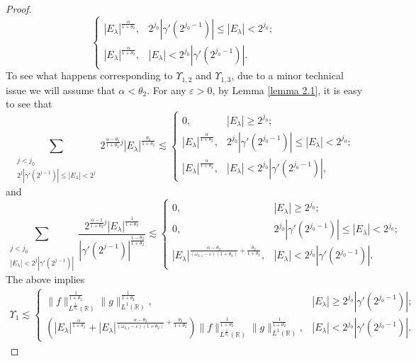 \documentclass[11pt, twoside, leqno]{article}
\theoremstyle{definition}
\numberwithin{equation}{section}
\begin{document}
\begin{proof}
$$\begin{cases}
  |E_\lambda|^{\frac{\alpha}{1+\theta_{2}}}, & 2^{j_0}|\gamma'(2^{j_{0}-1})|\leq|E_{\lambda}|<2^{j_0};\\
  |E_\lambda|^{\frac{\alpha}{1+\theta_{2}}}, &|E_{\lambda}|<2^{j_0}|\gamma'(2^{j_{0}-1})|.
\end{cases}$$
To see what happens corresponding to $\Upsilon_{1,2}$ and $\Upsilon_{1,3}$, due to a minor technical issue we will assume that $\alpha<\theta_2$. For any $\varepsilon>0$, by Lemma \ref{lemma 2.1}, it is easy to see that
$$\sum\limits_{  \substack{j<j_{0}   \\ 2^j{|\gamma'(2^{j-1})|}\leq|E_{\lambda}|<2^j }} 2^{{\frac{\alpha-\theta_{2}}{1+\theta_{2}}}j}|E_\lambda|^{\frac{\theta_{2}}{1+\theta_{2}}}\lesssim
\begin{cases}
  0, & |E_\lambda|\geq2^{j_0}; \\
  |E_\lambda|^{\frac{\alpha}{1+\theta_{2}}}, & 2^{j_0}|\gamma'(2^{j_{0}-1})|\leq|E_{\lambda}|<2^{j_0};\\
  |E_\lambda|^{\frac{\alpha}{1+\theta_{2}}}, &|E_{\lambda}|<2^{j_0}|\gamma'(2^{j_{0}-1})|,
\end{cases}$$
and
$$\sum\limits_{  \substack{j<j_{0}   \\ |E_{\lambda}|<2^j|\gamma'(2^{j-1})| }} \frac{2^{{\frac{\alpha-1}{1+\theta_{2}}j}}|E_\lambda|^{\frac{1}{1+\theta_{2}}}}{|\gamma'(2^{j-1})|^{\frac{1-\theta_{2}}{1+\theta_{2}}}}\lesssim
\begin{cases}
  0, & |E_\lambda|\geq2^{j_0}; \\
  0, & 2^{j_0}|\gamma'(2^{j_{0}-1})|\leq|E_{\lambda}|<2^{j_0};\\
  |E_\lambda|^{{\frac{\alpha-\theta_{2}}{(\omega_{0,1}-\varepsilon)(1+\theta_{2})}}+{\frac{\theta_{2}}{1+\theta_{2}}}}, &|E_{\lambda}|<2^{j_0}|\gamma'(2^{j_{0}-1})|.
\end{cases}$$
The above implies
\begin{align}\label{eq:5.3}
\Upsilon_1\lesssim
\begin{cases}
  \|f\|^{\frac{1}{1+\theta_2}}_{L^{\frac{1}{\theta_2}}(\mathbb{R})}\|g\|^{\frac{1}{1+\theta_2}}_{L^{1}(\mathbb{R})}, & |E_\lambda|\geq2^{j_0}|\gamma'(2^{j_{0}-1})|; \\
  \left(|E_\lambda|^{\frac{\alpha}{1+\theta_{2}}}+|E_\lambda|^{{\frac{\alpha-\theta_{2}}{(\omega_{0,1}-\varepsilon)(1+\theta_{2})}}+{\frac{\theta_{2}}{1+\theta_{2}}}}\right)
\|f\|^{\frac{1}{1+\theta_2}}_{L^{\frac{1}{\theta_2}}(\mathbb{R})}\|g\|^{\frac{1}{1+\theta_2}}_{L^{1}(\mathbb{R})}, &|E_{\lambda}|<2^{j_0}|\gamma'(2^{j_{0}-1})|.
\end{cases}
 \end{align}


\end{proof}
\end{document}
